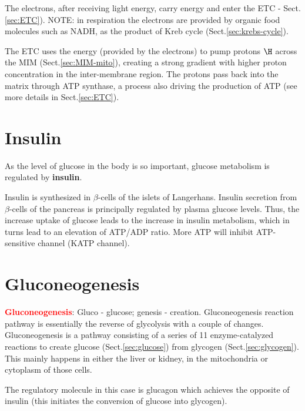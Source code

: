 The electrons, after receiving light energy, carry energy and enter the ETC -
Sect.\ref{sec:ETC}). NOTE:  in respiration the electrons are provided by organic
food molecules such as NADH,  as the product of Kreb cycle
(Sect.\ref{sec:krebs-cycle}).

The ETC uses the energy (provided by the electrons) to pump protons $\H$ across
the MIM (Sect.\ref{sec:MIM-mito}), creating a strong gradient with higher
proton concentration in the inter-membrane region. The protons pass back
into the matrix through ATP synthase, a process also driving the production of
ATP (see more details in Sect.\ref{sec:ETC}).

\section{Insulin}
\label{sec:insulin}

As the level of glucose in the body is so important, glucose
metabolism is regulated by {\bf insulin}.

Insulin is synthesized in $\beta$-cells of the islets of
Langerhans. Insulin secretion from $\beta$-cells of the pancreas is
principally regulated by plasma glucose levels. Thus, the increase
uptake of glucose leads to the increase in insulin metabolism, which
in turns lead to an elevation of ATP/ADP ratio. More ATP will inhibit
ATP-sensitive  channel (KATP channel).


\section{Gluconeogenesis}
\label{sec:gluconeogenesis}

\textcolor{red}{{\bf Gluconeogenesis}}: Gluco - glucose; genesis - creation.
Gluconeogenesis reaction pathway is essentially the reverse of glycolysis with a
couple of changes. Gluconeogenesis is a pathway consisting of a series of 11
enzyme-catalyzed reactions to create glucose (Sect.\ref{sec:glucose}) from
glycogen (Sect.\ref{sec:glycogen}). This mainly happens in either the liver or
kidney, in the mitochondria or cytoplasm of those cells.

The regulatory molecule in this case is glucagon which achieves the opposite of
insulin (this initiates the conversion of glucose into glycogen).


